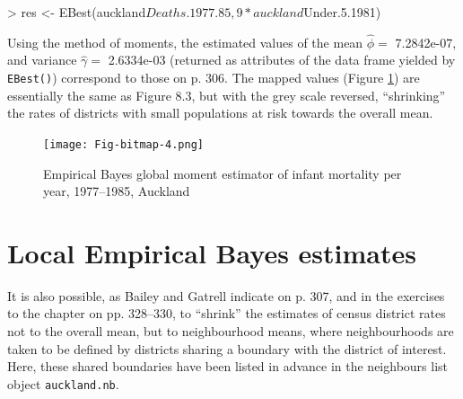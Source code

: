 \documentclass[a4paper,10pt]{article}
\newcommand{\code}[1]{\texttt{\small #1}}
\begin{document}
\begin{footnotesize}
\begin{Schunk}
\begin{Sinput}
> res <- EBest(auckland$Deaths.1977.85, 9 * auckland$Under.5.1981)
\end{Sinput}
\end{Schunk}
\end{footnotesize}
Using the method of moments, the estimated values of the mean $\hat{\phi} = $ 7.2842e-07, and variance $\hat{\gamma} = $ 2.6334e-03 (returned as attributes of the data frame yielded by \code{EBest()}) correspond to those on p. 306. The mapped values (Figure \ref{EBest}) are essentially the same as Figure 8.3, but with the grey scale reversed, ``shrinking'' the rates of districts with small populations at risk towards the overall mean. 


\begin{footnotesize}
\begin{Schunk}
\end{Schunk}
\begin{Schunk}
\end{Schunk}
\end{footnotesize}

\begin{figure}[htbp]
\begin{center} 
\begin{Schunk}
\texttt{[image: Fig-bitmap-4.png]}\end{Schunk}
\end{center}
\caption{Empirical Bayes global moment estimator of infant mortality per year, 1977--1985, Auckland}
\label{EBest}
\end{figure}


\section{Local Empirical Bayes estimates}

It is also possible, as Bailey and Gatrell indicate on p. 307, and in the exercises to the chapter on pp. 328--330, to ``shrink'' the estimates of census district rates not to the overall mean, but to neighbourhood means, where neighbourhoods are taken to be defined by districts sharing a boundary with the district of interest. Here, these shared boundaries have been listed in advance in the neighbours list object \code{auckland.nb}.
\end{document}
